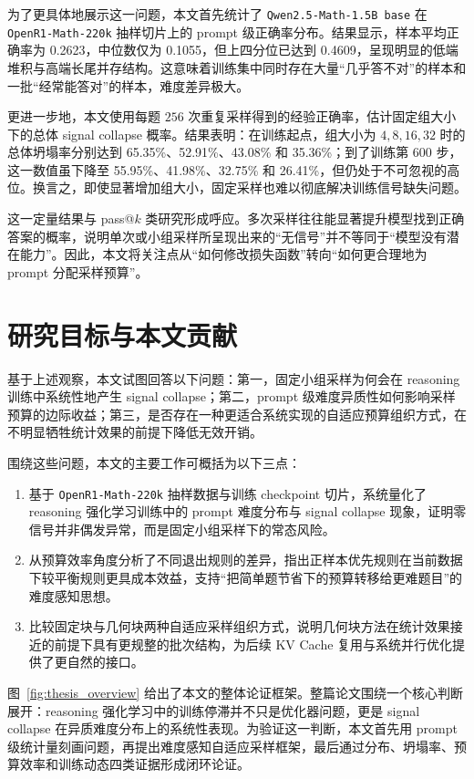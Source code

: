 为了更具体地展示这一问题，本文首先统计了 \texttt{Qwen2.5-Math-1.5B base} 在 \texttt{OpenR1-Math-220k} 抽样切片上的 prompt 级正确率分布。结果显示，样本平均正确率为 0.2623，中位数仅为 0.1055，但上四分位已达到 0.4609，呈现明显的低端堆积与高端长尾并存结构。这意味着训练集中同时存在大量“几乎答不对”的样本和一批“经常能答对”的样本，难度差异极大。

更进一步地，本文使用每题 $256$ 次重复采样得到的经验正确率，估计固定组大小下的总体 signal collapse 概率。结果表明：在训练起点，组大小为 $4,8,16,32$ 时的总体坍塌率分别达到 65.35\%、52.91\%、43.08\% 和 35.36\%；到了训练第 600 步，这一数值虽下降至 55.95\%、41.98\%、32.75\% 和 26.41\%，但仍处于不可忽视的高位。换言之，即使显著增加组大小，固定采样也难以彻底解决训练信号缺失问题。

这一定量结果与 pass@$k$ 类研究形成呼应。多次采样往往能显著提升模型找到正确答案的概率，说明单次或小组采样所呈现出来的“无信号”并不等同于“模型没有潜在能力”\citep{chen2021codex,wang2022selfconsistency,kim2025reinforcement}。因此，本文将关注点从“如何修改损失函数”转向“如何更合理地为 prompt 分配采样预算”。

\section{研究目标与本文贡献}

基于上述观察，本文试图回答以下问题：第一，固定小组采样为何会在 reasoning 训练中系统性地产生 signal collapse；第二，prompt 级难度异质性如何影响采样预算的边际收益；第三，是否存在一种更适合系统实现的自适应预算组织方式，在不明显牺牲统计效果的前提下降低无效开销。

围绕这些问题，本文的主要工作可概括为以下三点：
\begin{enumerate}
    \item 基于 \texttt{OpenR1-Math-220k} 抽样数据与训练 checkpoint 切片，系统量化了 reasoning 强化学习训练中的 prompt 难度分布与 signal collapse 现象，证明零信号并非偶发异常，而是固定小组采样下的常态风险。
    \item 从预算效率角度分析了不同退出规则的差异，指出正样本优先规则在当前数据下较平衡规则更具成本效益，支持“把简单题节省下的预算转移给更难题目”的难度感知思想。
    \item 比较固定块与几何块两种自适应采样组织方式，说明几何块方法在统计效果接近的前提下具有更规整的批次结构，为后续 KV Cache 复用与系统并行优化提供了更自然的接口。
\end{enumerate}

图~\ref{fig:thesis_overview} 给出了本文的整体论证框架。整篇论文围绕一个核心判断展开：reasoning 强化学习中的训练停滞并不只是优化器问题，更是 signal collapse 在异质难度分布上的系统性表现。为验证这一判断，本文首先用 prompt 级统计量刻画问题，再提出难度感知自适应采样框架，最后通过分布、坍塌率、预算效率和训练动态四类证据形成闭环论证。

